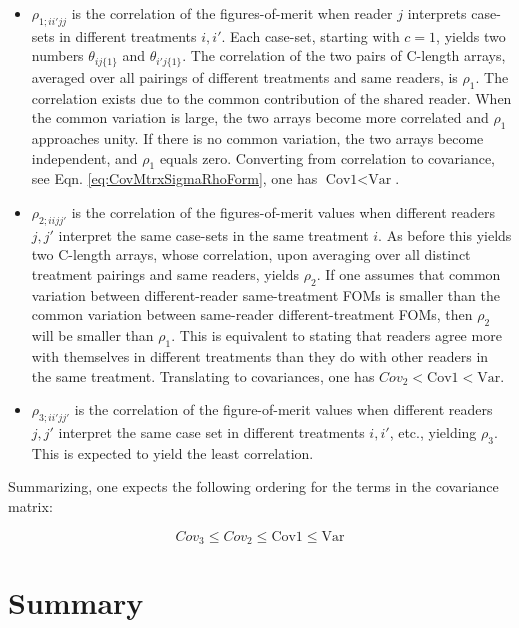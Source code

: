 \documentclass[
]{book}
\begin{document}
\begin{itemize}
\item
  \(\rho_{1;ii'jj}\) is the correlation of the figures-of-merit when reader \(j\) interprets case-sets in different treatments \(i,i'\). Each case-set, starting with \(c = 1\), yields two numbers \(\theta_{ij\{1\}}\) and \(\theta_{i'j\{1\}}\). The correlation of the two pairs of C-length arrays, averaged over all pairings of different treatments and same readers, is \(\rho_1\). The correlation exists due to the common contribution of the shared reader. When the common variation is large, the two arrays become more correlated and \(\rho_1\) approaches unity. If there is no common variation, the two arrays become independent, and \(\rho_1\) equals zero. Converting from correlation to covariance, see Eqn. \eqref{eq:CovMtrxSigmaRhoForm}, one has \(\text{Cov1} < \text{Var}\).
\item
  \(\rho_{2;iijj'}\) is the correlation of the figures-of-merit values when different readers \(j,j'\) interpret the same case-sets in the same treatment \(i\). As before this yields two C-length arrays, whose correlation, upon averaging over all distinct treatment pairings and same readers, yields \(\rho_2\). If one assumes that common variation between different-reader same-treatment FOMs is smaller than the common variation between same-reader different-treatment FOMs, then \(\rho_2\) will be smaller than \(\rho_1\). This is equivalent to stating that readers agree more with themselves in different treatments than they do with other readers in the same treatment. Translating to covariances, one has \(Cov_2 < \text{Cov1} < \text{Var}\).
\item
  \(\rho_{3;ii'jj'}\) is the correlation of the figure-of-merit values when different readers \(j,j'\) interpret the same case set in different treatments \(i,i'\), etc., yielding \(\rho_3\). This is expected to yield the least correlation.
\end{itemize}

Summarizing, one expects the following ordering for the terms in the covariance matrix:

\begin{equation}
Cov_3 \leq  Cov_2 \leq  \text{Cov1} \leq  \text{Var}
\label{eq:CovOrderings}
\end{equation}

\hypertarget{ORMethodIntro-Summary}{%
\section{Summary}\label{ORMethodIntro-Summary}}
\end{document}
